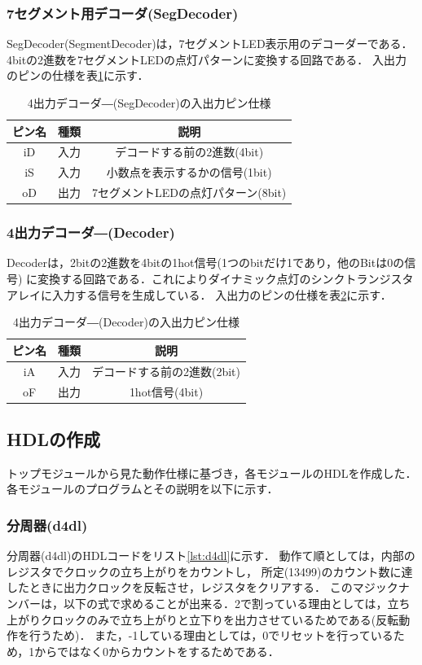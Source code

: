 \documentclass[a4paper,11pt]{ltjsarticle}
\begin{document}
\subsubsection{7セグメント用デコーダ(SegDecoder)}
SegDecoder(SegmentDecoder)は，7セグメントLED表示用のデコーダーである．
4bitの2進数を7セグメントLEDの点灯パターンに変換する回路である．
入出力のピンの仕様を表\ref{tab:segdecoder}に示す．
\begin{table}[H]
    \centering
    \caption{4出力デコーダ―(SegDecoder)の入出力ピン仕様}
    \label{tab:segdecoder}
    \begin{tabular}{|c|c|c|}
        \hline
        ピン名 & 種類 & 説明                     \\
        \hline
        iD  & 入力 & デコードする前の2進数(4bit)      \\
        \hline
        iS  & 入力 & 小数点を表示するかの信号(1bit)     \\
        \hline
        oD  & 出力 & 7セグメントLEDの点灯パターン(8bit) \\
        \hline
    \end{tabular}
\end{table}
\subsubsection{4出力デコーダ―(Decoder)}
Decoderは，2bitの2進数を4bitの1hot信号(1つのbitだけ1であり，他のBitは0の信号)
に変換する回路である．これによりダイナミック点灯のシンクトランジスタアレイに入力する信号を生成している．
入出力のピンの仕様を表\ref{tab:decoder}に示す．
\begin{table}[H]
    \centering
    \caption{4出力デコーダ―(Decoder)の入出力ピン仕様}
    \label{tab:decoder}
    \begin{tabular}{|c|c|c|}
        \hline
        ピン名 & 種類 & 説明                \\
        \hline
        iA  & 入力 & デコードする前の2進数(2bit) \\
        \hline
        oF  & 出力 & 1hot信号(4bit)      \\
        \hline
    \end{tabular}
\end{table}
\subsection{HDLの作成}
トップモジュールから見た動作仕様に基づき，各モジュールのHDLを作成した．
各モジュールのプログラムとその説明を以下に示す．
\subsubsection{分周器(d4dl)}
分周器(d4dl)のHDLコードをリスト\ref{lst:d4dl}に示す．
動作て順としては，内部のレジスタでクロックの立ち上がりをカウントし，
所定(13499)のカウント数に達したときに出力クロックを反転させ，レジスタをクリアする．
このマジックナンバーは，以下の式で求めることが出来る．2で割っている理由としては，立ち上がりクロックのみで立ち上がりと立下りを出力させているためである(反転動作を行うため)．
また，-1している理由としては，0でリセットを行っているため，1からではなく0からカウントをするためである．
\end{document}
